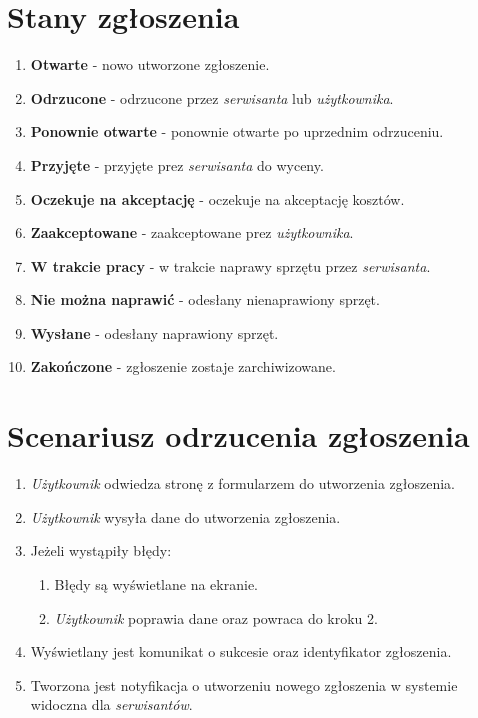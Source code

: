 \documentclass[11pt,a4paper]{article}
\begin{document}
\section{Stany zgłoszenia}
\begin{enumerate}
\item{\textbf{Otwarte} - nowo utworzone zgłoszenie.}
\item{\textbf{Odrzucone} - odrzucone przez \textit{serwisanta} lub \textit{użytkownika}.}
\item{\textbf{Ponownie otwarte} - ponownie otwarte po uprzednim odrzuceniu.}
\item{\textbf{Przyjęte} - przyjęte prez \textit{serwisanta} do wyceny.}
\item{\textbf{Oczekuje na akceptację} - oczekuje na akceptację kosztów.}
\item{\textbf{Zaakceptowane} - zaakceptowane prez \textit{użytkownika}.}
\item{\textbf{W trakcie pracy} - w trakcie naprawy sprzętu przez \textit{serwisanta}.}
\item{\textbf{Nie można naprawić} - odesłany nienaprawiony sprzęt.}
\item{\textbf{Wysłane} - odesłany naprawiony sprzęt.}
\item{\textbf{Zakończone} - zgłoszenie zostaje zarchiwizowane.}
\end{enumerate}

\vfill

\section{Scenariusz odrzucenia zgłoszenia}
\begin{enumerate}
\item{\textit{Użytkownik} odwiedza stronę z formularzem do utworzenia zgłoszenia.}
\item{\textit{Użytkownik} wysyła dane do utworzenia zgłoszenia.}
\item{Jeżeli wystąpiły błędy:}
\begin{enumerate}
\item{Błędy są wyświetlane na ekranie.}
\item{\textit{Użytkownik} poprawia dane oraz powraca do kroku 2.}
\end{enumerate}
\item{Wyświetlany jest komunikat o sukcesie oraz identyfikator zgłoszenia.}
\item{Tworzona jest notyfikacja o utworzeniu nowego zgłoszenia w systemie widoczna dla \textit{serwisantów}.}
\end{enumerate}
\end{document}
